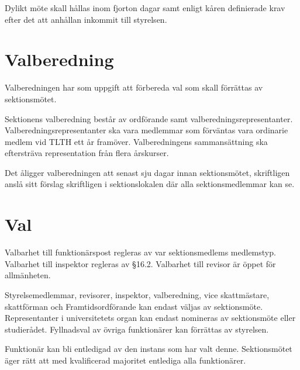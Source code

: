 \documentclass[stadgar]{dsekprotokoll}
\begin{document}
\begin{stadgeavsnitt}
Dylikt möte skall hållas inom fjorton dagar samt enligt kåren definierade krav efter det att anhållan inkommit till styrelsen.


\end{stadgeavsnitt}

\section{Valberedning}

\begin{stadgeavsnitt}


Valberedningen har som uppgift att förbereda val som skall förrättas av
sektionsmötet.


Sektionens valberedning består av ordförande samt valberedningsrepresentanter. Valberedningsrepresentanter ska vara medlemmar som förväntas vara ordinarie medlem vid TLTH ett år
framöver. Valberedningens sammansättning ska eftersträva representation från flera årskurser.



Det åligger valberedningen att senast sju dagar innan sektionsmötet, skriftligen anslå sitt förslag skriftligen i sektionslokalen där alla sektionsmedlemmar kan se.

\end{stadgeavsnitt}

\section{Val}

\begin{stadgeavsnitt}


Valbarhet till funktionärspost regleras av var sektionsmedlems
medlemstyp. Valbarhet till inspektor regleras av \S16.2. Valbarhet till revisor är öppet för
allmänheten.


Styrelsemedlemmar, revisorer, inspektor, valberedning, vice skattmästare, skattförman och Framtidsordförande kan endast väljas av sektionsmöte. Representanter i universitetets organ kan endast nomineras av sektionsmöte eller studierådet. Fyllnadsval av övriga
funktionärer kan förrättas av styrelsen.




Funktionär kan bli entledigad av den instans som har valt denne. Sektionsmötet äger rätt
att med kvalificerad majoritet entlediga alla funktionärer.

\end{stadgeavsnitt}
\end{document}
